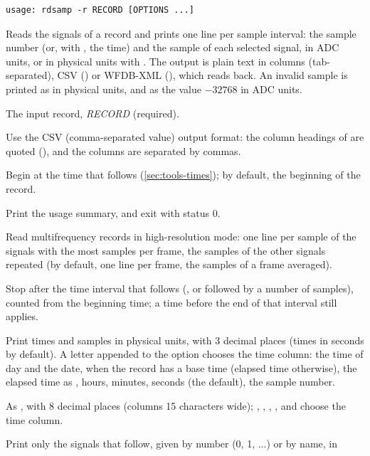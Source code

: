 \begin{lstlisting}[style=signature,language={}]
usage: rdsamp -r RECORD [OPTIONS ...]
\end{lstlisting}
Reads the signals of a record and prints one line per sample interval: the sample number
(or, with , the time) and the sample of each selected signal, in ADC units, or in
physical units with . The output is plain text in columns (tab-separated), CSV
() or WFDB-XML (), which  reads back. An invalid sample is
printed as \code{-} in physical units, and as the value $-32768$ in ADC units.
\begin{params}
\item[-r] The input record, \textit{RECORD} (required).
\item[-c] Use the CSV (comma-separated value) output format: the column headings of
   are quoted (), and the columns are separated by
  commas.
\item[-f] Begin at the time that follows (\cref{sec:tools-times}); by default, the beginning
  of the record.
\item[-h] Print the usage summary, and exit with status 0.
\item[-H] Read multifrequency records in high-resolution mode: one line per sample of the
  signals with the most samples per frame, the samples of the other signals repeated (by
  default, one line per frame, the samples of a frame averaged).
\item[-l] Stop after the time interval that follows (, or  followed
  by a number of samples), counted from the beginning time; a  time before the end
  of that interval still applies.
\item[-p] Print times and samples in physical units, with 3 decimal places (times in
  seconds by default). A letter appended to the option chooses the time column:
   the time of day and the date, when the record has a base time (elapsed time
  otherwise),  the elapsed time as ,  hours,
   minutes,  seconds (the default),  the sample number.
\item[-P] As , with 8 decimal places (columns 15 characters wide); ,
  , , ,  and  choose the time column.
\item[-s] Print only the signals that follow, given by number (0, 1, ...) or by name, in

\end{params}
